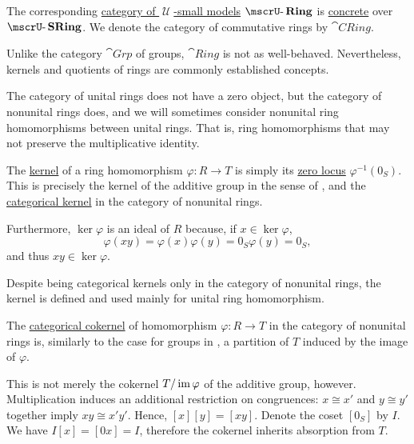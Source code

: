 \begin{definition}
\begin{thmenum}
     The corresponding \hyperref[def:category_of_small_first_order_models]{category of \( \mscrU \)-small models} \( \ucat{Ring} \) is \hyperref[def:concrete_category]{concrete} over \hyperref[def:monoid]{\( \ucat{SRing} \)}. We denote the category of commutative rings by \( \cat{CRing} \).

    Unlike the category \hyperref[def:group/category]{\( \cat{Grp} \)} of groups, \( \cat{Ring} \) is not as well-behaved. Nevertheless, kernels and quotients of rings are commonly established concepts.

    The category of unital rings does not have a zero object, but the category of nonunital rings does, and we will sometimes consider nonunital ring homomorphisms between unital rings. That is, ring homomorphisms that may not preserve the multiplicative identity.

     The \hyperref[def:zero_morphisms/kernel]{kernel} of a ring homomorphism \( \varphi: R \to T \) is simply its \hyperref[def:zero_locus]{zero locus} \( \varphi^{-1}(0_S) \). This is precisely the kernel of the additive group in the sense of , and the \hyperref[def:zero_morphisms/cokernel]{categorical kernel} in the category of nonunital rings.

    Furthermore, \( \ker \varphi \) is an ideal of \( R \) because, if \( x \in \ker \varphi \),
    \begin{equation*}
      \varphi(xy)
      =
      \varphi(x) \varphi(y)
      =
      0_S \varphi(y)
      =
      0_S,
    \end{equation*}
    and thus \( xy \in \ker \varphi \).

    Despite being categorical kernels only in the category of nonunital rings, the kernel is defined and used mainly for unital ring homomorphism.

     The \hyperref[def:zero_morphisms/cokernel]{categorical cokernel} of homomorphism \( \varphi: R \to T \) in the category of nonunital rings is, similarly to the case for groups in , a partition of \( T \) induced by the image of \( \varphi \).

    This is not merely the cokernel \( T / \operatorname{im} \varphi \) of the additive group, however. Multiplication induces an additional restriction on congruences: \( x \cong x' \) and \( y \cong y' \) together imply \( x y \cong x' y' \). Hence, \( [x][y] = [xy] \).  Denote the coset \( [0_S] \) by \( I \). We have \( I[x] = [0x] = I \), therefore the cokernel inherits absorption from \( T \).


\end{thmenum}
\end{definition}
